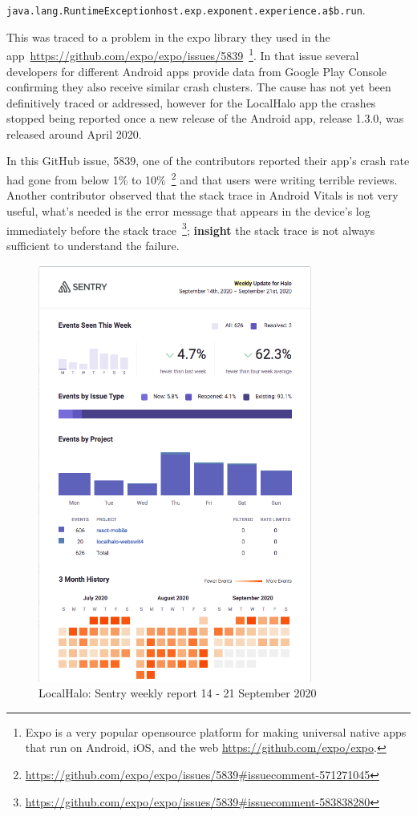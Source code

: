 \texttt{java.lang.RuntimeExceptionhost.exp.exponent.experience.a\$b.run}. 

This was traced to a problem in the expo library they used in the app~\url{https://github.com/expo/expo/issues/5839}~\footnote{Expo is a very popular opensource platform for making universal native apps that run on Android, iOS, and the web \url{https://github.com/expo/expo}.}. In that issue several developers for different Android apps provide data from Google Play Console confirming they also receive similar crash clusters. The cause has not yet been definitively traced or addressed, however for the LocalHalo app the crashes stopped being reported once a new release of the Android app, release 1.3.0, was released around  April 2020.

In this GitHub issue, 5839, one of the contributors reported their app's crash rate had gone from below 1\% to 10\%~\footnote{\url{https://github.com/expo/expo/issues/5839\#issuecomment-571271045}} and that users were writing terrible reviews. Another contributor observed that the stack trace in Android Vitals is not very useful, what's needed is the error message that appears in the device's log immediately before the stack trace~\footnote{\url{https://github.com/expo/expo/issues/5839\#issuecomment-583838280}}; 
\textbf{insight} the stack trace is not always sufficient to understand the failure\label{insight-expo-stack-trace-not-sufficient-to-identify-the-failure}.

\begin{figure}[htbp!]
    \centering
    \includegraphics[width=9cm]{images/localhalo/sentry-weekly-report-21-Sep-2020.png}
    \caption{LocalHalo: Sentry weekly report 14 - 21 September 2020}
    \label{fig:localhalo-sentry-weekly-report-21-sep-2020}
\end{figure}

